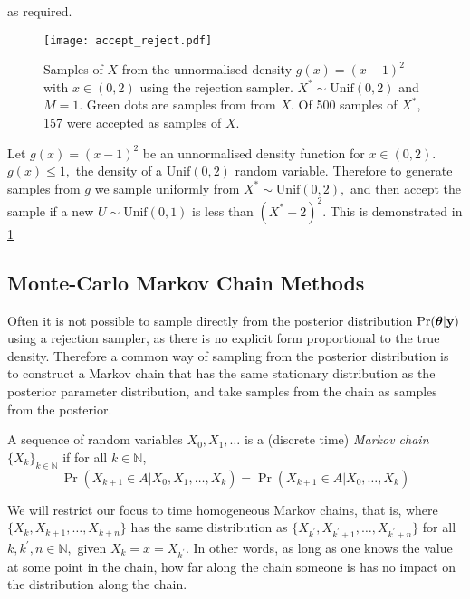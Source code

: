 as required.

\begin{figure}
    \centering
    \texttt{[image: accept\_reject.pdf]}
    \caption{
        Samples of $X$ from the unnormalised density $g(x) = (x - 1)^2$ with
        $x\in(0,2)$ using the rejection sampler. $X^\ast\sim\mathrm{Unif}(0,2)$
        and $M = 1.$
        Green dots are samples from
        from $X.$
        Of 500 samples of $X^\ast$, 157 were accepted as samples of $X$.
    }
    \label{fig:accept_reject}
\end{figure}

\begin{example}
    Let $g(x) = (x - 1)^2$ be an unnormalised density function for
    $x \in (0,2).$ $g(x) \leq 1,$ the density of a $\mathrm{Unif}(0,2)$ random
    variable. Therefore to generate samples from $g$ we sample uniformly from
    $X^\ast \sim \mathrm{Unif}(0, 2),$ and then accept the sample if a new
    $U \sim \mathrm{Unif}(0, 1)$ is less than $(X^\ast - 2)^2.$ This is
    demonstrated in \ref{fig:accept_reject}
\end{example}

\subsection*{Monte-Carlo Markov Chain Methods}

Often it is not possible to sample directly from the posterior distribution
$\Pr(\bm{\theta}|\mathbf{y})$ using a rejection sampler, as there is no
explicit form proportional to the true density.
Therefore a common way of sampling from the posterior distribution is
to construct a Markov chain that has the same stationary distribution as the
posterior parameter distribution, and take samples from the chain as samples
from the posterior.

\begin{definition}
    A sequence of random variables
    $X_0, X_1, \dots$
    is a (discrete time) \emph{Markov chain} $\{X_k\}_{k\in\mathbb{N}}$ if for
    all
    $k\in\mathbb{N}$,
    $$
        \Pr(X_{k+1}\in A|X_0, X_1, \dots, X_k) = \Pr(X_{k+1}\in A|X_0, \dots, X_k)
    $$
\end{definition}

We will restrict our focus to time homogeneous Markov chains, that is, where
$\{X_k, X_{k+1}, \dots, X_{k + n}\}$ has the same distribution as
$\{X_{k^\prime}, X_{k^\prime+1}, \dots, X_{k^\prime + n}\}$ for all
$k, k^\prime, n \in \mathbb{N},$ given $X_k = x = X_{k^\prime}$. In other words,
as long as one knows the value at some point in the chain, how far along the
chain someone is has no impact on the distribution along the chain.

